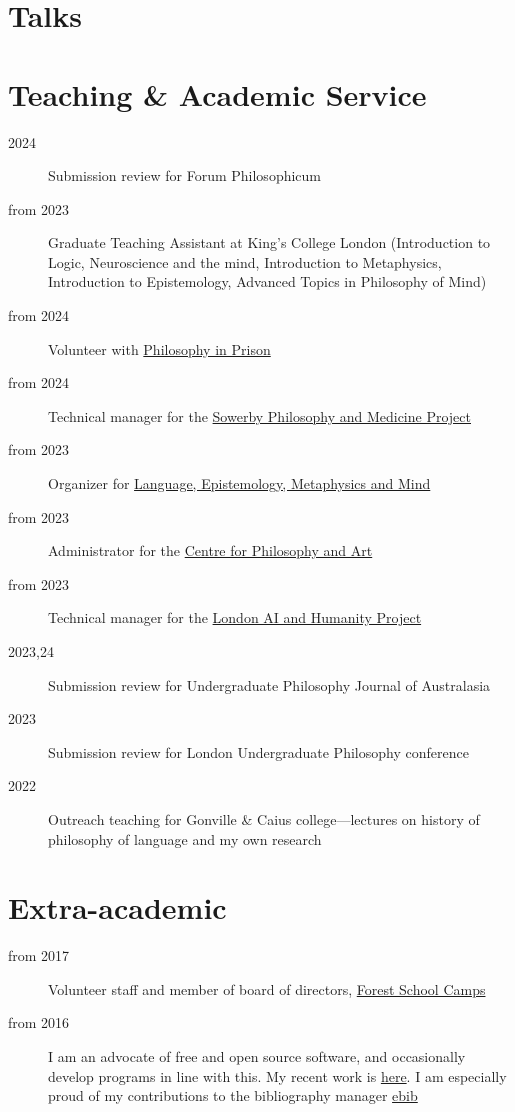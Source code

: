 \documentclass{cv}
\begin{document}
\section*{Talks}
\printbibliography[check=Presentation]{}

\section*{Teaching \& Academic Service}
\begin{description}
\item[{2024}] Submission review for Forum Philosophicum
\item[{from 2023}] Graduate Teaching Assistant at King's College London
(Introduction to Logic, Neuroscience and the mind, Introduction to
Metaphysics, Introduction to Epistemology, Advanced Topics in
Philosophy of Mind)
\item[{from 2024}] Volunteer with \href{https://www.philosophyinprison.com/}{Philosophy in Prison}
\item[{from 2024}] Technical manager for the \href{https://www.philosophyandmedicine.org/}{Sowerby Philosophy and
Medicine Project}
\item[{from 2023}] Organizer for \href{https://www.lemm-london.co.uk/}{Language, Epistemology, Metaphysics and Mind}
\item[{from 2023}] Administrator for the \href{https://philosophyarts.co.uk/}{Centre for Philosophy and Art}
\item[{from 2023}] Technical manager for the \href{https://www.ai-humanity-london.com/}{London AI and Humanity Project}
\item[{2023,24}] Submission review for Undergraduate Philosophy Journal of
Australasia
\item[{2023}] Submission review for London Undergraduate Philosophy
conference
\item[{2022}] Outreach teaching for Gonville \& Caius college---lectures on
history of philosophy of language and my own research
\end{description}

\section*{Extra-academic}
\begin{description}
\item[{from 2017}] Volunteer staff and member of board of directors,
\href{https://www.fsc.org.uk/}{Forest School Camps}
\item[{from 2016}] I am an advocate of free and open source software, and
occasionally develop programs in line with this. My recent work is
\href{https://github.com/Hugo-Heagren}{here}. I am especially proud of my contributions to the bibliography
manager \href{https://joostkremers.github.io/ebib/}{ebib}
\end{description}
\end{document}
